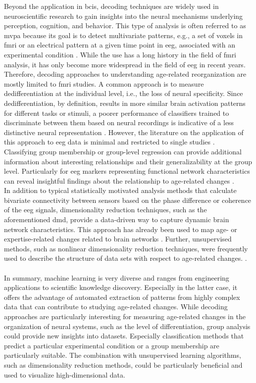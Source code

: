 Beyond the application in \glspl{bci}, decoding techniques are widely used in neuroscientific research to gain insights into the neural mechanisms underlying perception, cognition, and behavior. This type of analysis is often referred to as \gls{mvpa} because its goal is to detect multivariate patterns, e.g., a set of voxels in \gls{fmri} or an electrical pattern at a given time point in \gls{eeg}, associated with an experimental condition \cite{Holdgraf2017}. While the use has a long history in the field of \gls{fmri} analysis, it has only become more widespread in the field of \gls{eeg} in recent years. Therefore, decoding approaches to understanding age-related reorganization are mostly limited to \gls{fmri} studies. A common approach is to measure dedifferentiation at the individual level, i.e., the loss of neural specificity. Since dedifferentiation, by definition, results in more similar brain activation patterns for different tasks or stimuli, a poorer performance of classifiers trained to discriminate between them based on neural recordings is indicative of a less distinctive neural representation \cite{Koen2019, Park2010}. However, the literature on the application of this approach to \gls{eeg} data is minimal and restricted to single studies \cite{Chen2019}.\\
Classifying group membership or group-level regression can provide additional information about interesting relationships and their generalizability at the group level. Particularly for \gls{eeg} markers representing functional network characteristics can reveal insightful findings about the relationship to age-related changes \cite{Petti2016}.\\
In addition to typical statistically motivated analysis methods that calculate bivariate connectivity between sensors based on the phase difference or coherence of the \gls{eeg} signals, dimensionality reduction techniques, such as the aforementioned \gls{dmd}, provide a data-driven way to capture dynamic brain network characteristics. This approach has already been used to map age- or expertise-related changes related to brain networks \cite{Vieluf2018}. Further, unsupervised methods, such as nonlinear dimensionality reduction techniques, were frequently used to describe the structure of data sets with respect to age-related changes.  \cite{Banville2021,Kottlarz2020}.\\
\\
In summary, machine learning is very diverse and ranges from engineering applications to scientific knowledge discovery. Especially in the latter case, it offers the advantage of automated extraction of patterns from highly complex data that can contribute to studying age-related changes. While decoding approaches are particularly interesting for measuring age-related changes in the organization of neural systems, such as the level of differentiation, group analysis could provide new insights into datasets. Especially classification methods that predict a particular experimental condition or a group membership are particularly suitable. The combination with unsupervised learning algorithms, such as dimensionality reduction methods, could be particularly beneficial and used to visualize high-dimensional data.


